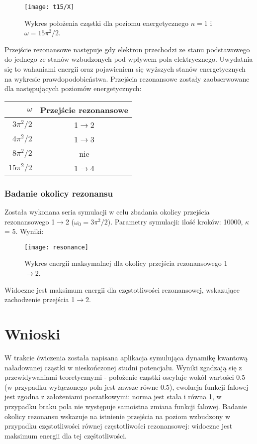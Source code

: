 \documentclass[a4paper,10pt]{article}
\begin{document}
	\begin{figure}[h]
	    \centering
	    \texttt{[image: t15/X]}
	    \caption{Wykres położenia cząstki dla poziomu energetycznego $n = 1$ i $\omega = 15\pi^2/2$.}
		\label{t15x}
	\end{figure}
	Przejście rezonansowe następuje gdy elektron przechodzi ze stanu podstawowego do jednego ze stanów wzbudzonych pod wpływem pola elektrycznego. Uwydatnia się to wahaniami energii oraz pojawieniem się wyższych stanów energetycznych na wykresie prawdopodobieństwa.  Przejścia rezonansowe zostały zaobserwowane dla następujących poziomów energetycznych:
	\begin{center}
		\begin{tabular}{r|c}
			$\omega$ & Przejście rezonansowe\\
			\hline
			\hline
			$3\pi^2/2$ & 1$\rightarrow$2 \\
			$4\pi^2/2$ & 1$\rightarrow$3 \\
			$8\pi^2/2$ & nie \\
			$15\pi^2/2$ & 1$\rightarrow$4
		\end{tabular}
	\end{center}
	\clearpage
	\subsubsection{Badanie okolicy rezonansu}
	Została wykonana seria symulacji w celu zbadania okolicy przejścia rezonansowego 1$\rightarrow$2 ($\omega_0 = 3\pi^2/2$). Parametry symulacji: ilość kroków: 10000, $\kappa$ = 5. Wyniki:
	\begin{figure}[h]
	    \centering
	    \texttt{[image: resonance]}
	    \caption{Wykres energii maksymalnej dla okolicy przejścia rezonansowego 1$\rightarrow$2.}
		\label{t15x}
	\end{figure}

	Widoczne jest maksimum energii dla częstotliwości rezonansowej, wskazujące zachodzenie przejścia 1$\rightarrow$2.
	\section{Wnioski}
	W trakcie ćwiczenia została napisana aplikacja symulująca dynamikę kwantową naładowanej cząstki w nieskończonej studni potencjału. Wyniki zgadzają się z przewidywaniami teoretycznymi - położenie cząstki oscyluje wokół wartości 0.5 (w przypadku wyłączonego pola jest zawsze równe 0.5), ewolucja funkcji falowej jest zgodna z założeniami poczatkowymi: norma jest stała i równa 1, w przypadku braku pola nie występuje samoistna zmiana funkcji falowej. Badanie okolicy rezonansu wskazuje na istnienie przejścia na poziom wzbudzony w przypadku częstotliwości równej częstotliwości rezonansowej: widoczne jest maksimum energii dla tej częśtotliwości.
\end{document}
